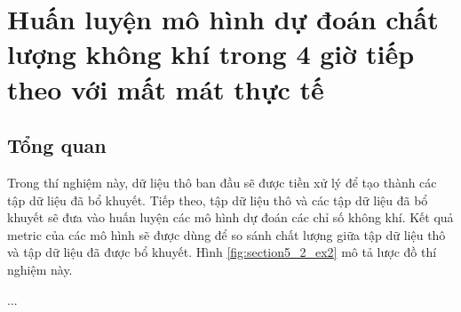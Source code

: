 \section{Huấn luyện mô hình dự đoán chất lượng không khí trong 4 giờ tiếp theo với mất mát thực tế} \label{ex-2}
\subsection{Tổng quan}
Trong thí nghiệm này, dữ liệu thô ban đầu sẽ được tiền xử lý để tạo thành các tập dữ liệu đã bổ khuyết. Tiếp theo, tập dữ liệu thô và các tập dữ liệu đã bổ khuyết sẽ đưa vào huấn luyện các mô hình dự đoán các chỉ số không khí. Kết quả metric của các mô hình sẽ được dùng để so sánh chất lượng giữa tập dữ liệu thô và tập dữ liệu đã được bổ khuyết. Hình \ref{fig:section5_2_ex2} mô tả lược đồ thí nghiệm này.

...
